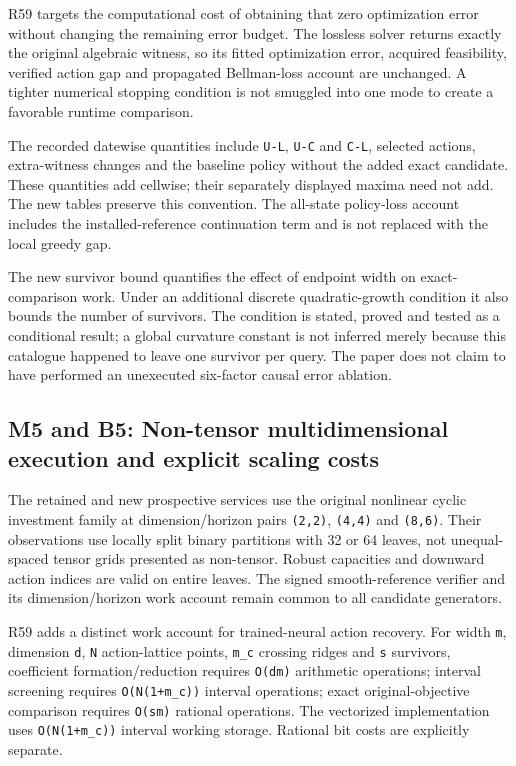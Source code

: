 R59 targets the computational cost of obtaining that zero optimization
error without changing the remaining error budget. The lossless solver
returns exactly the original algebraic witness, so its fitted
optimization error, acquired feasibility, verified action gap and
propagated Bellman-loss account are unchanged. A tighter numerical
stopping condition is not smuggled into one mode to create a favorable
runtime comparison.

The recorded datewise quantities include \texttt{U-L}, \texttt{U-C} and
\texttt{C-L}, selected actions, extra-witness changes and the baseline
policy without the added exact candidate. These quantities add cellwise;
their separately displayed maxima need not add. The new tables preserve
this convention. The all-state policy-loss account includes the
installed-reference continuation term and is not replaced with the local
greedy gap.

The new survivor bound quantifies the effect of endpoint width on
exact-comparison work. Under an additional discrete quadratic-growth
condition it also bounds the number of survivors. The condition is
stated, proved and tested as a conditional result; a global curvature
constant is not inferred merely because this catalogue happened to leave
one survivor per query. The paper does not claim to have performed an
unexecuted six-factor causal error ablation.

\hypertarget{m5-and-b5-non-tensor-multidimensional-execution-and-explicit-scaling-costs}{%
\subsection{M5 and B5: Non-tensor multidimensional execution and
explicit scaling
costs}\label{m5-and-b5-non-tensor-multidimensional-execution-and-explicit-scaling-costs}}

The retained and new prospective services use the original nonlinear
cyclic investment family at dimension/horizon pairs \texttt{(2,2)},
\texttt{(4,4)} and \texttt{(8,6)}. Their observations use locally split
binary partitions with 32 or 64 leaves, not unequal-spaced tensor grids
presented as non-tensor. Robust capacities and downward action indices
are valid on entire leaves. The signed smooth-reference verifier and its
dimension/horizon work account remain common to all candidate
generators.

R59 adds a distinct work account for trained-neural action recovery. For
width \texttt{m}, dimension \texttt{d}, \texttt{N} action-lattice
points, \texttt{m\_c} crossing ridges and \texttt{s} survivors,
coefficient formation/reduction requires \texttt{O(dm)} arithmetic
operations; interval screening requires \texttt{O(N(1+m\_c))} interval
operations; exact original-objective comparison requires \texttt{O(sm)}
rational operations. The vectorized implementation uses
\texttt{O(N(1+m\_c))} interval working storage. Rational bit costs are
explicitly separate.

